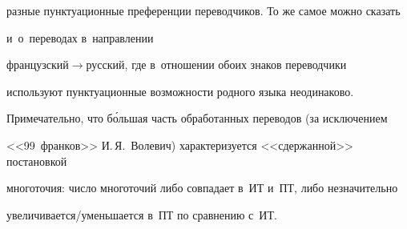 разные пунктуационные преференции переводчиков. То же самое можно сказать 


и~о~переводах в~направлении  


фран\-цуз\-ский\;$\to$\;рус\-ский, где в~отношении обоих знаков переводчики 


используют пунктуационные возможности родного языка неодинаково. 


Примечательно, что б\'{о}льшая часть обработанных переводов (за исключением 


<<99~франков>> И.\,Я.~Волевич) характеризуется <<сдержанной>> постановкой 


многоточия: число многоточий либо совпадает в~ИТ и~ПТ, либо незначительно  


уве\-ли\-чи\-ва\-ет\-ся\!/\!умень\-ша\-ет\-ся в~ПТ по сравнению с~ИТ.





  



